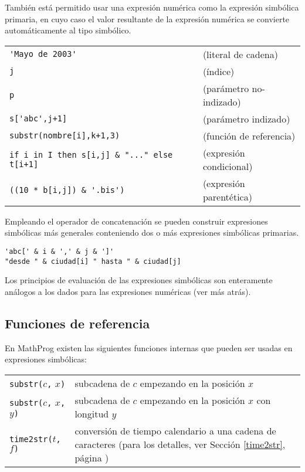 \documentclass[11pt,spanish]{report}
\def\para#1{\noindent{\bf#1}}
\begin{document}
También está permitido usar una expresión numérica como la expresión simbólica primaria, en cuyo caso el valor resultante de la expresión numérica se convierte automáticamente al tipo simbólico.

\para{Ejemplos}

\noindent
\begin{tabular}{@{}ll@{}}
\verb|'Mayo de 2003'|&(literal de cadena)\\
\verb|j|&(índice)\\
\verb|p|&(parámetro no-indizado)\\
\verb|s['abc',j+1]|&(parámetro indizado)\\
\verb|substr(nombre[i],k+1,3)|&(función de referencia)\\
\verb|if i in I then s[i,j] & "..." else t[i+1]|& (expresión condicional) \\
\verb|((10 * b[i,j]) & '.bis')|&(expresión parentética)\\
\end{tabular}

Empleando el operador de concatenación se pueden construir expresiones simbólicas más generales conteniendo dos o más expresiones simbólicas primarias.

\para{Ejemplos}

\begin{verbatim}
'abc[' & i & ',' & j & ']'
"desde " & ciudad[i] " hasta " & ciudad[j]
\end{verbatim}

Los principios de evaluación de las expresiones simbólicas son enteramente análogos a los dados para las expresiones numéricas (ver más atrás).

\subsection{Funciones de referencia}

En MathProg existen las siguientes funciones internas que pueden ser usadas en expresiones simbólicas:

\begin{tabular}{@{}p{112pt}p{328pt}@{}}
{\tt substr(}$c${\tt,} $x${\tt)}&subcadena de $c$ empezando en la posición $x$\\
{\tt substr(}$c${\tt,} $x${\tt,} $y${\tt)}&subcadena de $c$ empezando en la posición $x$ con longitud $y$\\
{\tt time2str(}$t${\tt,} $f${\tt)}&conversión de tiempo calendario a una cadena de caracteres (para los detalles, ver Sección \ref{time2str}, página
\pageref{time2str})\\
\end{tabular}
\end{document}
